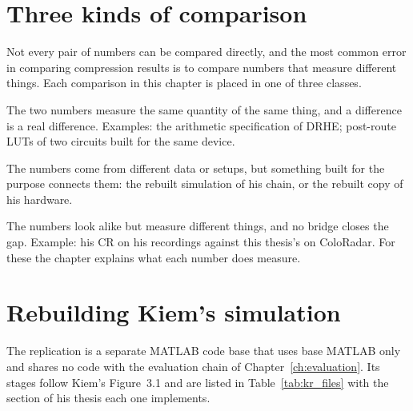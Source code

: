 \section{Three kinds of comparison}
\label{sec:kc_kinds}

Not every pair of numbers can be compared directly, and the most common error
in comparing compression results is to compare numbers that measure different
things. Each comparison in this chapter is placed in one of three classes.

\begin{description}[leftmargin=!,labelwidth=30mm,style=nextline,font=\normalfont\bfseries]
\item[Like for like] The two numbers measure the same quantity of the same
thing, and a difference is a real difference. Examples: the arithmetic
specification of DRHE; post-route LUTs of two circuits built for the same
device.
\item[Through a bridge] The numbers come from different data or setups, but
something built for the purpose connects them: the rebuilt simulation of his
chain, or the rebuilt copy of his hardware.
\item[Not comparable] The numbers look alike but measure different things, and
no bridge closes the gap. Example: his CR on his recordings against this
thesis's on ColoRadar. For these the chapter explains what each number does
measure.
\end{description}

\section{Rebuilding Kiem's simulation}
\label{sec:kr_built}

The replication is a separate MATLAB code base that uses base MATLAB only and
shares no code with the evaluation chain of Chapter~\ref{ch:evaluation}. Its
stages follow Kiem's Figure~3.1 and are listed in Table~\ref{tab:kr_files} with
the section of his thesis each one implements.

